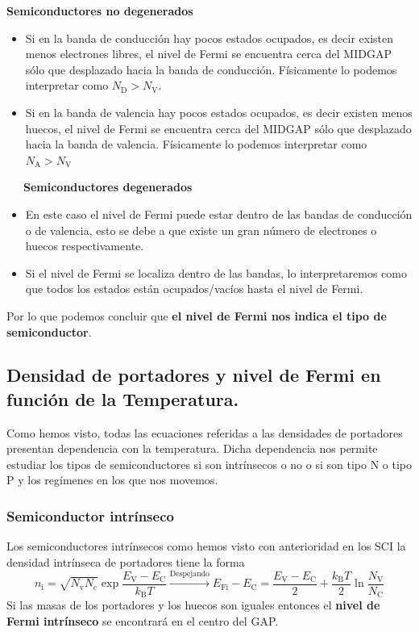 \indent   \textbf{Semiconductores no degenerados}
\begin{itemize}
    \item Si en la banda de conducción hay pocos estados ocupados, es decir existen menos electrones libres, el nivel de Fermi se encuentra cerca del MIDGAP sólo que desplazado hacia la banda de conducción. Físicamente lo podemos interpretar como $N_\mathrm{D}>N_\mathrm{V}$.
    \item Si en la banda de valencia hay pocos estados ocupados, es decir existen menos huecos, el nivel de Fermi se encuentra cerca del MIDGAP sólo que desplazado hacia la banda de valencia. Físicamente lo podemos interpretar como $N_\mathrm{A}>N_\mathrm{V}$
\end{itemize}
\indent \ \ \  \textbf{Semiconductores degenerados}
\begin{itemize}
    \item En este caso el nivel de Fermi puede estar dentro de las bandas de conducción o de valencia, esto se debe a que existe un gran número de electrones o huecos respectivamente.
    \item Si el nivel de Fermi se localiza dentro de las bandas, lo interpretaremos como que todos los estados están ocupados/vacíos hasta el nivel de Fermi.
\end{itemize} Por lo que podemos concluir que \textbf{el nivel de Fermi nos indica el tipo de semiconductor}.
 \newpage
 \subsection{Densidad de portadores y nivel de Fermi en función de la Temperatura.} \label{sec: Densidad de portadores y nivel de fermi en funcion de la temperatura}
Como hemos visto, todas las ecuaciones referidas a las densidades de portadores presentan dependencia con la temperatura. Dicha dependencia nos permite estudiar los tipos de semiconductores si son intrínsecos o no o si son tipo N o tipo P y los regímenes en los que nos movemos.
\subsubsection{Semiconductor intrínseco}
\noindent Los semiconductores intrínsecos como hemos visto con anterioridad en los SCI la densidad intrínseca de portadores tiene la forma
\begin{equation}
    n_\mathrm{i}=\sqrt{N_\mathrm{v} N_\mathrm{c}} \exp{\frac{E_\mathrm{V}-E_\mathrm{C}}{k_\mathrm{B}T}} \xrightarrow{\text{Despejando}} E_\mathrm{Fi}-E_\mathrm{C}=\frac{E_\mathrm{V}-E_\mathrm{C}}{2}+\frac{k_\mathrm{B}T}{2} \ln{\frac{N_\mathrm{V}}{N_\mathrm{C}}}
    \label{eq: Nivel de Fermi intrínseco}
\end{equation}
Si las masas de los portadores y los huecos son iguales entonces el \textbf{nivel de Fermi intrínseco} se encontrará en el centro del GAP.
